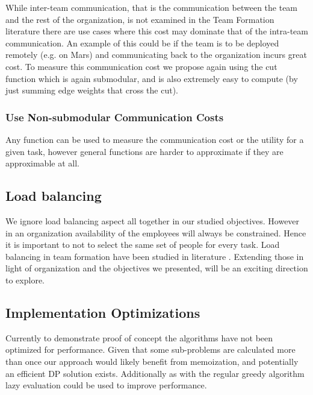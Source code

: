 While inter-team communication, that is the communication between the team and the rest of the organization, is not examined in the Team Formation literature there are use cases where this cost may dominate that of the intra-team communication. An example of this could be if the team is to be deployed remotely (e.g. on Mars) and communicating back to the organization incurs great cost. To measure this communication cost we propose again using the cut function which is again submodular, and is also extremely easy to compute (by just summing edge weights that cross the cut).

\subsubsection{Use Non-submodular Communication Costs}

Any function can be used to measure the communication cost or the utility for a given task, however general functions are harder to approximate if they are approximable at all. 

\subsection{Load balancing}

We ignore load balancing aspect all together in our studied objectives. However in an organization availability of the employees will always be constrained. Hence it is important to not to select the same set of people for every task. Load balancing in team formation have been studied in literature \cite{wang2016ustf,liu2017simple}. Extending those in light of organization and the objectives we presented, will be an exciting direction to explore. 

\subsection{Implementation Optimizations}

Currently to demonstrate proof of concept the algorithms have not been optimized for performance. Given that some sub-problems are calculated more than once our approach would likely benefit from memoization, and potentially an efficient DP solution exists. Additionally as with the regular greedy algorithm lazy evaluation could be used to improve performance. 

  